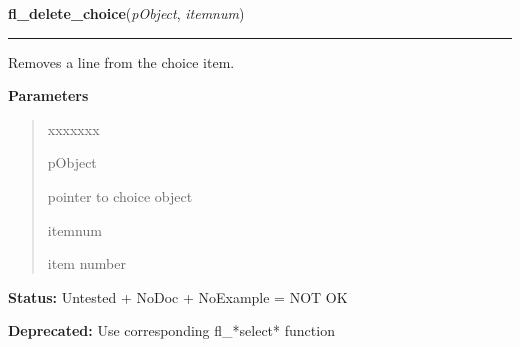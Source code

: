 \hspace{.8\funcindent}\begin{boxedminipage}{\funcwidth}

    \raggedright \textbf{fl\_delete\_choice}(\textit{pObject}, \textit{itemnum})

    \vspace{-1.5ex}

    \rule{\textwidth}{0.5\fboxrule}
\setlength{\parskip}{2ex}
    Removes a line from the choice item.

\setlength{\parskip}{1ex}
      \textbf{Parameters}
      \vspace{-1ex}

      \begin{quote}
        \begin{Ventry}{xxxxxxx}

          \item[pObject]

          pointer to choice object

          \item[itemnum]

          item number

        \end{Ventry}

      \end{quote}

\textbf{Status:} Untested + NoDoc + NoExample = NOT OK



\textbf{Deprecated:} Use corresponding fl\_*select* function



    \end{boxedminipage}

    \label{xformslib:library:fl_set_choice}

    \vspace{0.5ex}

